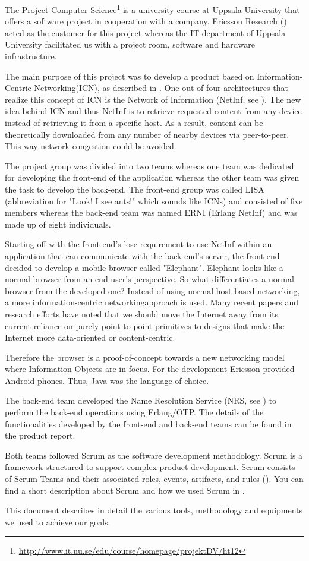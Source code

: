 The Project Computer Science\footnote{\url{http://www.it.uu.se/edu/course/homepage/projektDV/ht12}} is a university
course at Uppsala University that offers a software project in cooperation with a company. Ericsson Research (\cite{ericsson}) acted as 
the customer for this project whereas the IT department of Uppsala University facilitated us with a project room, software and hardware infrastructure.

The main purpose of this project was to develop a product based on Information-Centric Networking(ICN), as described in \cite{netinf}.
One out of four architectures that realize this concept of ICN is the Network of Information (NetInf, see \cite{netinf}). 
The new idea behind ICN and thus NetInf is to retrieve requested content from any device  instead of retrieving it from a specific host. 
As a result, content can be theoretically downloaded from any number of nearby devices via peer-to-peer. 
This way network congestion could be avoided.

The project group was divided into two teams whereas one team was dedicated for developing the front-end of the 
application whereas the other team was given the task to develop the back-end. The front-end group was called 
LISA (abbreviation for "Look! I see ants!" which sounds like ICNs) and consisted of five members whereas 
the back-end team was named ERNI (Erlang NetInf) and was made up of eight individuals. 

Starting off with the front-end's lose requirement to use NetInf within an application that can communicate with
the back-end's server, the front-end decided to develop a mobile browser called "Elephant". 
Elephant looks like a normal browser from an end-user's perspective. So what differentiates a 
normal browser from the developed one? Instead of using normal host-based networking, a more information-centric networkingapproach is used. 
Many recent papers and research efforts have noted that we should move the Internet 
away from its current reliance on purely point-to-point primitives to designs that make the Internet more data-oriented or content-centric. \cite{ghodsietal}  

Therefore the browser is a proof-of-concept towards a new networking model where Information Objects are in focus.
For the development Ericsson provided Android phones. Thus, Java was the language of choice.

The back-end team developed the Name Resolution Service (NRS, see \cite{netinf}) to perform the back-end operations using Erlang/OTP\cite{erlang}. 
The details of the functionalities developed 
by the front-end and back-end teams can be found in the product report. 

Both teams followed Scrum as the software development methodology. Scrum is a framework structured to support complex product development. Scrum consists of
Scrum Teams and their associated roles, events, artifacts, and rules (\cite{scrumpaper}).
You can find a short description about Scrum and
how we used Scrum in .

This document describes in detail the various tools, methodology and equipments we used to achieve our goals. 
